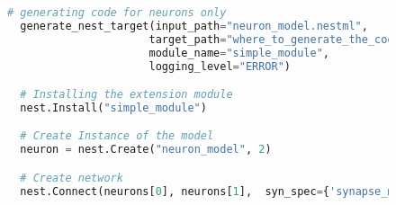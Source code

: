 \begin{figure}[ht!]
  \centering
  \begin{lstlisting}[language=Python, label=lst:nestml_without_synapse, caption={Generating extension module code: The \texttt{generate\_nest\_target} function  generates code only of a neuron model. The minimum required parameter of the function is the \texttt{input\_path} that points to the location of the model. Once the code is generated, the built libraries can be loaded using the \texttt{Install} function by providing the \emph{simple\_module} as the name of the generated library. Is the model installed in NEST, we can create an instance of the model by calling the \texttt{Create} function with the model name being the name that was writen in the NESTML file in the \emph{neuron} block.}, captionpos=b]
  # generating code for neurons only
  generate_nest_target(input_path="neuron_model.nestml",
                      target_path="where_to_generate_the_code",
                      module_name="simple_module",
                      logging_level="ERROR")

  # Installing the extension module
  nest.Install("simple_module")

  # Create Instance of the model
  neuron = nest.Create("neuron_model", 2)

  # Create network
  nest.Connect(neurons[0], neurons[1],  syn_spec={'synapse_model': "any_built_in_synapse_type"})
  \end{lstlisting}
  \end{figure}

